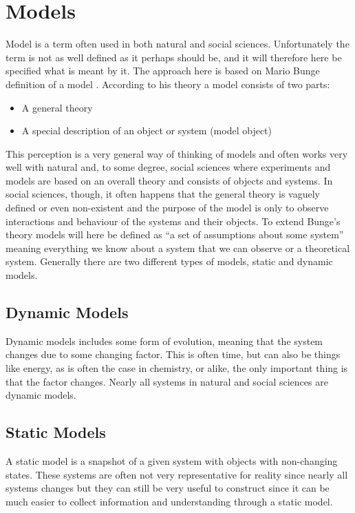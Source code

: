 \section{Models}
\label{sec:models}
Model is a term often used in both natural and social sciences. Unfortunately the term is not as well defined as it perhaps should be, and it will therefore here be specified what is meant by it. The approach here is based on Mario Bunge definition of a model . According to his theory a model consists of two parts:

\begin{itemize}
\item A general theory
\item A special description of an object or system (model object)
\end{itemize}

This perception is a very general way of thinking of models and often works very well with natural and, to some degree, social sciences where experiments and models are based on an overall theory and consists of objects and systems. In social sciences, though, it often happens that the general theory is vaguely defined or even non-existent and the purpose of the model is only to observe interactions and behaviour of the systems and their objects.
To extend Bunge's theory models will here be defined as \enquote{a set of assumptions about some system} meaning everything we know about a system that we can observe or a theoretical system.
Generally there are two different types of models, static and dynamic models.


\subsection{Dynamic Models}
Dynamic models includes some form of evolution, meaning that the system changes due to some changing factor. This is often time, but can also be things like energy, as is often the case in chemistry, or alike, the only important thing is that the factor changes. Nearly all systems in natural and social sciences are dynamic models.


\subsection{Static Models}
A static model is a snapshot of a given system with objects with non-changing states. These systems are often not very representative for reality since nearly all systems changes but they can still be very useful to construct since it can be much easier to collect information and understanding through a static model.


